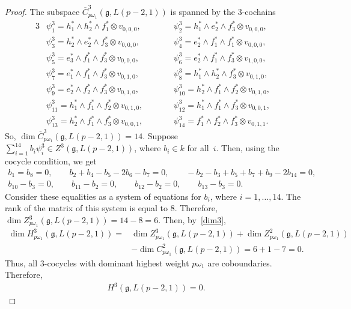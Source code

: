 \documentclass[10pt,a4paper]{amsart}
\numberwithin{equation}{section}
\begin{document}
\begin{proof}
The subspace $\overline{C}^3_{p\omega_1}(\mathfrak{g},L(p-2,1))$ is spanned by the $3$-cochains
\begin{alignat*}{3}
&\psi_1^3=h_1^*\wedge h_2^*\wedge f_1^*\otimes v_{0,0,0},\qquad&&
\psi_2^3=h_1^*\wedge e_2^*\wedge f_3^*\otimes v_{0,0,0},&
\\
&\psi_3^3=h_2^*\wedge e_2^*\wedge f_3^*\otimes v_{0,0,0},\qquad&&
\psi_4^3=e_2^*\wedge f_1^*\wedge f_1^*\otimes v_{0,0,0},&
\\
&\psi_5^3=e_3^*\wedge f_1^*\wedge f_3^*\otimes v_{0,0,0},\qquad&&
\psi_6^3=e_2^*\wedge f_1^*\wedge f_3^*\otimes v_{1,0,0},&
\\
&\psi_7^3=e_1^*\wedge f_1^*\wedge f_3^*\otimes v_{0,1,0},\qquad&&
\psi_8^3=h_1^*\wedge h_2^*\wedge f_3^*\otimes v_{0,1,0},&
\\
&\psi_9^3=e_2^*\wedge f_2^*\wedge f_3^*\otimes v_{0,1,0},\qquad&&
\psi_{10}^3=h_2^*\wedge f_1^*\wedge f_2^*\otimes v_{0,1,0},&
\\
&\psi_{11}^3=h_1^*\wedge f_1^*\wedge f_2^*\otimes v_{0,1,0},\qquad&&
\psi_{12}^3=h_1^*\wedge f_1^*\wedge f_3^*\otimes v_{0,0,1},&
\\
&\psi_{13}^3=h_2^*\wedge f_1^*\wedge f_3^*\otimes v_{0,0,1},\qquad&&
\psi_{14}^3=f_1^*\wedge f_2^*\wedge f_3^*\otimes v_{0,1,1}.&
\end{alignat*}
So, $\dim \overline{C}^3_{p\omega_1}(\mathfrak{g},L(p-2,1))=14$. Suppose $\sum_{i=1}^{14}b_i\psi_i^3\in Z^3(\mathfrak{g},L(p-2,1))$, where $b_i\in k$ for all~$i$. Then, using the cocycle condition, we get
\begin{gather*}
b_1=b_8=0,
\qquad
b_2+b_4-b_5-2b_6-b_7=0,
\qquad
-b_2-b_3+b_5+b_7+b_9-2b_{14}=0,
\\
b_{10}-b_3=0,
\qquad
b_{11}-b_2=0,
\qquad
b_{12}-b_2=0,
\qquad
b_{13}-b_3=0.
\end{gather*}
Consider these equalities as a system of equations for $b_i$, where $i=1,\dots,14$. The rank of the matrix of this system is equal to $8$. Therefore, $\dim Z^3_{p\omega_1}(\mathfrak{g},L(p-2,1))=14-8=6$. Then, by~\eqref{dim3},
\begin{align*}
\dim H^3_{p\omega_1}(\mathfrak{g},L(p-2,1))={}&
\dim Z^3_{p\omega_1}(\mathfrak{g},L(p-2,1))+\dim Z^2_{p\omega_1}(\mathfrak{g},L(p-2,1))
\\
&-\dim C^2_{p\omega_1}(\mathfrak{g},L(p-2,1))=6+1-7=0.
\end{align*}
Thus, all $3$-cocycles with dominant highest weight $p\omega_1$ are coboundaries. Therefore,
\begin{gather*}
H^3(\mathfrak{g},L(p-2,1))=0.
\end{gather*}


\end{proof}
\end{document}
